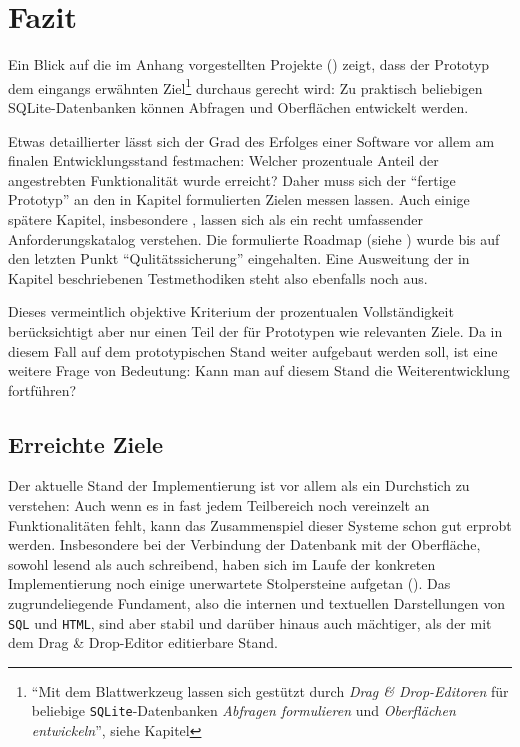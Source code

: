 \section{Fazit}
\label{sec:conclusion}

Ein Blick auf die im Anhang vorgestellten Projekte () zeigt, dass der Prototyp dem eingangs erwähnten Ziel\footnote{"`Mit dem Blattwerkzeug lassen sich gestützt durch \textit{Drag \& Drop-Editoren} für beliebige \texttt{SQLite}-Datenbanken \textit{Abfragen formulieren} und \textit{Oberflächen entwickeln}"', siehe Kapitel } durchaus gerecht wird: Zu praktisch beliebigen SQLite-Datenbanken können Abfragen und Oberflächen entwickelt werden.

Etwas detaillierter lässt sich der Grad des Erfolges einer Software vor allem am finalen Entwicklungsstand festmachen: Welcher prozentuale Anteil der angestrebten Funktionalität wurde erreicht? Daher muss sich der "`fertige Prototyp"' an den in Kapitel  formulierten Zielen messen lassen. Auch einige spätere Kapitel, insbesondere , lassen sich als ein recht umfassender Anforderungskatalog verstehen. Die formulierte Roadmap (siehe ) wurde bis auf den letzten Punkt "`Qulitätssicherung"' eingehalten. Eine Ausweitung der in Kapitel  beschriebenen Testmethodiken steht also ebenfalls noch aus.

Dieses vermeintlich objektive Kriterium der prozentualen Vollständigkeit berücksichtigt aber nur einen Teil der für Prototypen wie  \idename{} relevanten Ziele. Da in diesem Fall auf dem prototypischen Stand weiter aufgebaut werden soll, ist eine weitere Frage von Bedeutung: Kann man auf diesem Stand die Weiterentwicklung fortführen?

\subsection{Erreichte Ziele}

Der aktuelle Stand der Implementierung ist vor allem als ein Durchstich zu verstehen: Auch wenn es in fast jedem Teilbereich noch vereinzelt an Funktionalitäten fehlt, kann das Zusammenspiel dieser Systeme schon gut erprobt werden. Insbesondere bei der Verbindung der Datenbank mit der Oberfläche, sowohl lesend als auch schreibend, haben sich im Laufe der konkreten Implementierung noch einige unerwartete Stolpersteine aufgetan (). Das zugrundeliegende Fundament, also die internen und textuellen Darstellungen von \texttt{SQL} und \texttt{HTML}, sind aber stabil und darüber hinaus auch mächtiger, als der mit dem Drag \& Drop-Editor editierbare Stand.

